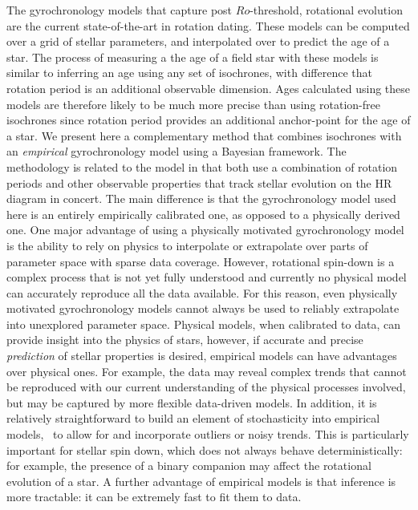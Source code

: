 The gyrochronology models that capture post $Ro$-threshold, rotational
evolution \citep{vansaders2016} are the current state-of-the-art in rotation
dating.
These models can be computed over a grid of stellar parameters, and
interpolated over to predict the age of a star.
The process of measuring a the age of a field star with these models is
similar to inferring an age using any set of isochrones, with difference that
rotation period is an additional observable dimension.
Ages calculated using these models are therefore likely to be much more
precise than using rotation-free isochrones since rotation period provides an
additional anchor-point for the age of a star.
We present here a complementary method that combines isochrones with an {\it
empirical} gyrochronology model using a Bayesian framework.
The methodology is related to the \citet{vansaders2016} model in that both use
a combination of rotation periods and other observable properties that track
stellar evolution on the HR diagram in concert.
The main difference is that the gyrochronology model used here is an entirely
empirically calibrated one, as opposed to a physically derived one.
One major advantage of using a physically motivated gyrochronology model is
the ability to rely on physics to interpolate or extrapolate over parts of
parameter space with sparse data coverage.
However, rotational spin-down is a complex process that is not yet fully
understood and currently no physical model can accurately reproduce all the
data available.
For this reason, even physically motivated gyrochronology models cannot always
be used to reliably extrapolate into unexplored parameter space.
Physical models, when calibrated to data, can provide insight into the physics
of stars, however, if accurate and precise {\it prediction} of stellar
properties is desired, empirical models can have advantages over physical
ones.
For example, the data may reveal complex trends that cannot be reproduced with
our current understanding of the physical processes involved, but may be
captured by more flexible data-driven models.
In addition, it is relatively straightforward to build an element of
stochasticity into empirical models, \ie\ to allow for and incorporate
outliers or noisy trends.
This is particularly important for stellar spin down, which does not always
behave deterministically: for example, the presence of a binary companion may
affect the rotational evolution of a star.
A further advantage of empirical models is that inference is more tractable:
it can be extremely fast to fit them to data.
